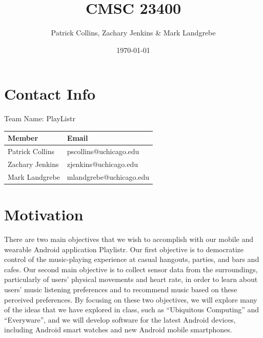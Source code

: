 \documentclass[12pt]{article}
\begin{document}
\title{CMSC 23400}
\author{Patrick Collins, Zachary Jenkins \& Mark Landgrebe}
\date{\today}
\maketitle
\pagebreak

\section{Contact Info}
Team Name: PlayListr

\begin{center}
\begin{tabular}{l|l}
 Member           &  Email                    \\ \hline
 Patrick Collins  &  pscollins@uchicago.edu   \\
 Zachary Jenkins  &  zjenkins@uchicago.edu    \\
 Mark Landgrebe   &  mlandgrebe@uchicago.edu  \\
\end{tabular}
\end{center}

\pagebreak

\section{Motivation}

There are two main objectives that we wish to accomplish with our
mobile and wearable Android application Playlistr. Our first objective
is to democratize control of the music-playing experience at casual
hangouts, parties, and bars and cafes. Our second main objective is to
collect sensor data from the surroundings, particularly of users’
physical movements and heart rate, in order to learn about users’
music listening preferences and to recommend music based on these
perceived preferences. By focusing on these two objectives, we will
explore many of the ideas that we have explored in class, such as
“Ubiquitous Computing” and “Everyware”, and we will develop software
for the latest Android devices, including Android smart watches and
new Android mobile smartphones.
\end{document}
